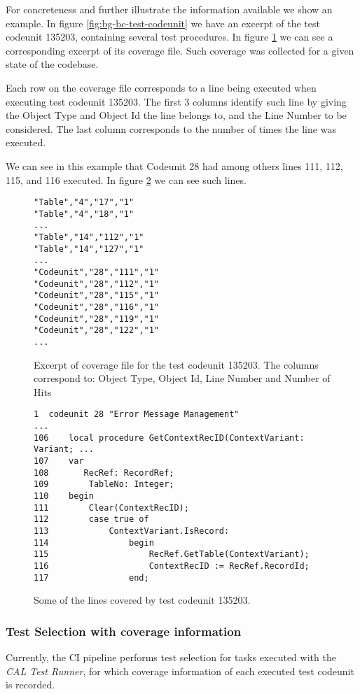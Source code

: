 For concreteness and further illustrate the information available we show an example. In figure \ref{fig:bg-bc-test-codeunit}
we have an excerpt of the test codeunit 135203, containing several test procedures. In figure \ref{fig:bg-bc-coveragefile} we can see
a corresponding excerpt of its coverage file. Such coverage was collected for a given state of the codebase.

Each row on the coverage file corresponds to a line being executed when executing test codeunit 135203. The first 3 columns 
identify such line by giving the Object Type and Object Id the line belongs to, and the Line Number to be considered. The last
column corresponds to the number of times the line was executed. 

We can see in this example that Codeunit 28 had among others lines 111, 112, 115, and 116  executed. In 
figure \ref{fig:bg-bc-covered-file} we can see such lines.

\begin{figure}
    \begin{Verbatim}[fontsize=\tiny]
"Table","4","17","1"
"Table","4","18","1"
...
"Table","14","112","1"
"Table","14","127","1"
...
"Codeunit","28","111","1"
"Codeunit","28","112","1"
"Codeunit","28","115","1"
"Codeunit","28","116","1"
"Codeunit","28","119","1"
"Codeunit","28","122","1"
...
    \end{Verbatim}
    \caption{Excerpt of coverage file for the test codeunit 135203. The columns correspond to: Object Type, Object Id, Line Number and Number of Hits}
    \label{fig:bg-bc-coveragefile}
\end{figure}

\begin{figure}
    \begin{Verbatim}[fontsize=\tiny]
1  codeunit 28 "Error Message Management"
...
106    local procedure GetContextRecID(ContextVariant: Variant; ...
107    var
108       RecRef: RecordRef;
109        TableNo: Integer;
110    begin
111        Clear(ContextRecID);
112        case true of
113            ContextVariant.IsRecord:
114                begin
115                    RecRef.GetTable(ContextVariant);
116                    ContextRecID := RecRef.RecordId;
117                end;
    \end{Verbatim}
    \caption{Some of the lines covered by test codeunit 135203.}
    \label{fig:bg-bc-covered-file}
\end{figure}

\subsubsection{Test Selection with coverage information}
Currently, the CI pipeline performs test selection for tasks executed with the \emph{CAL Test Runner},
for which coverage information of each executed test codeunit is recorded.

